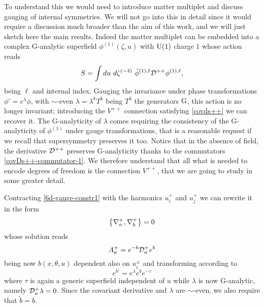 To understand this we would need to introduce matter multiplet and discuss gauging of internal symmetries. We will not go into this in detail since it would require a discussion much broader than the aim of this work, and we will just sketch here the main results. Indeed the matter multiplet can be embedded into a complex G-analytic superfield $\phi^{(1)}(\zeta,u)$ with ${ \text{U} }(1)$ charge $1$ whose action reads
\begin{equation}
S = \int du\  d\zeta^{(-4)}\  {\tilde\phi}^{(1),\ell} { \mathcal{D} }^{++} \phi^{(1),\ell},
\end{equation}
being $\ell$ and internal index.
Gauging the invariance under phase transformations $\phi' = e^{ \lambda} \phi$, with $\sim$-even $\lambda = \lambda^k T^k $ being $T^k$ the generators $ { \text{G} }$, this action is no longer invariant; introducing the $V^{++}$ connection satisfying \eqref{covds++} we can recover it. The G-analyticity of $\lambda$ comes requiring the consistency of the G-analyticity of $\phi^{(1)}$ under gauge transformations, that is a reasonable request if we recall that supersymmetry preserves it too. Notice that in the absence of \ym{} field, the derivative ${ \mathcal{D} }^{++}$ preserves G-analyticity thanks to the commutators \eqref{covDs++-commutator-1}.
We therefore understand that all what is needed to encode \ym{} degrees of freedom is the connection $V^{++}$, that we are going to study in some greater detail.


Contracting  \eqref{6d-gauge-constr1} with the harmonics $u^+_i$ and $u^+_j$ we can rewrite it in the form
\begin{equation}
\left\{ 
{ \mathcal{\nabla} }^+_a , { \mathcal{\nabla} }^+_b
\right\}
= 0
\end{equation}
whose solution reads
\begin{equation}
\label{6d-gauge-A+alpha}
A^+_a = e^{-b} { \mathcal{D} }^+_a e^b
\end{equation}
being now $b(x,\theta,u)$ dependent also on $u^\pm_i$ and transforming according to
\begin{equation}
e^{b'}
	=
e^{ \lambda} e^b e^{-\tau}
\end{equation}
where $\tau$ is again a generic superfield independent of $u$ while \(\lambda\) is now G-analytic, namely ${ \mathcal{D} }^+_a \lambda =0 $.
Since the covariant derivative and $\lambda$ are $\sim$-even, we also require that $\widetilde{ b }= b$.



